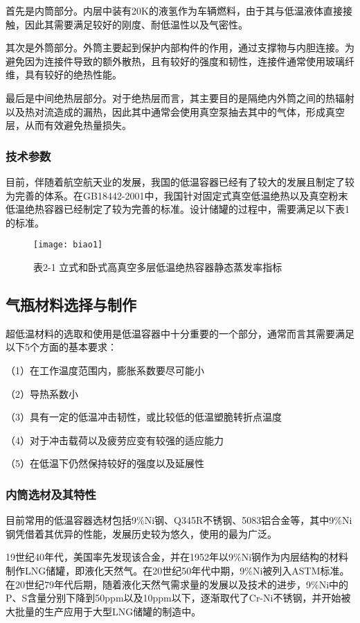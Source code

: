 \documentclass[UTF8,a4paper]{ctexart}
\newcommand{\upcite}[1]{\textsuperscript{\textsuperscript{\cite{#1}}}}
\begin{document}
	首先是内筒部分。内层中装有20K的液氢作为车辆燃料，由于其与低温液体直接接触，因此其需要满足较好的刚度、耐低温性以及气密性。
	
	其次是外筒部分。外筒主要起到保护内部构件的作用，通过支撑物与内胆连接。为避免因为连接件导致的额外散热，且有较好的强度和韧性，连接件通常使用玻璃纤维，具有较好的绝热性能。
	
	最后是中间绝热层部分。对于绝热层而言，其主要目的是隔绝内外筒之间的热辐射以及热对流造成的漏热，因此其中通常会使用真空泵抽去其中的气体，形成真空层，从而有效避免热量损失。
	\subsubsection{技术参数}
	目前，伴随着航空航天业的发展，我国的低温容器已经有了较大的发展且制定了较为完善的体系。在GB18442-2001中，我国针对固定式真空低温绝热以及真空粉末低温绝热容器已经制定了较为完善的标准。设计储罐的过程中，需要满足以下表1的标准。
	
	\begin{figure}[H]
		\centering
		\texttt{[image: biao1]}
		\caption*{表2-1 立式和卧式高真空多层低温绝热容器静态蒸发率指标}
		\label{fig:biao1}
	\end{figure}
	
	\subsection{气瓶材料选择与制作}
	超低温材料的选取和使用是低温容器中十分重要的一个部分，通常而言其需要满足以下5个方面的基本要求\upcite{ref3}：
		
	（1）在工作温度范围内，膨胀系数要尽可能小
		
	（2）导热系数小
		
	（3）具有一定的低温冲击韧性，或比较低的低温塑脆转折点温度
		
	（4）对于冲击载荷以及疲劳应变有较强的适应能力
		
	（5）在低温下仍然保持较好的强度以及延展性
	\subsubsection{内筒选材及其特性}
	目前常用的低温容器选材包括9\%Ni钢、Q345R不锈钢、5083铝合金等，其中9\%Ni钢凭借着其优异的性能，发展历史较为悠久，使用的最为广泛。
		
	19世纪40年代，美国率先发现该合金，并在1952年以9\%Ni钢作为内层结构的材料制作LNG储罐，即液化天然气。在20世纪50年代中期，9\%Ni被列入ASTM标准。在20世纪79年代后期，随着液化天然气需求量的发展以及技术的进步，9\%Ni中的P、S含量分别下降到50ppm以及10ppm以下，逐渐取代了Cr-Ni不锈钢，并开始被大批量的生产应用于大型LNG储罐的制造中\upcite{ref4}。
		
\end{document}
